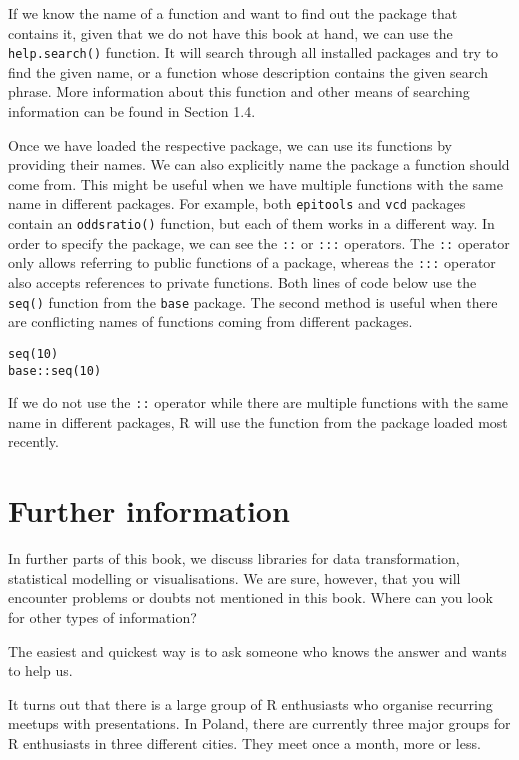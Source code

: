 \documentclass[]{book}
\theoremstyle{definition}
\theoremstyle{definition}
\theoremstyle{definition}
\theoremstyle{remark}
\begin{document}
If we know the name of a function and want to find out the package that
contains it, given that we do not have this book at hand, we can use the
\texttt{help.search()} function. It will search through all installed
packages and try to find the given name, or a function whose description
contains the given search phrase. More information about this function
and other means of searching information can be found in Section 1.4.

Once we have loaded the respective package, we can use its functions by
providing their names. We can also explicitly name the package a
function should come from. This might be useful when we have multiple
functions with the same name in different packages. For example, both
\texttt{epitools} and \texttt{vcd} packages contain an
\texttt{oddsratio()} function, but each of them works in a different
way. In order to specify the package, we can see the \texttt{::} or
\texttt{:::} operators. The \texttt{::} operator only allows referring
to public functions of a package, whereas the \texttt{:::} operator also
accepts references to private functions. Both lines of code below use
the \texttt{seq()} function from the \texttt{base} package. The second
method is useful when there are conflicting names of functions coming
from different packages.

\begin{verbatim}
seq(10)
base::seq(10)
\end{verbatim}

If we do not use the \texttt{::} operator while there are multiple
functions with the same name in different packages, R will use the
function from the package loaded most recently.

\section{Further information}\label{part_14}

In further parts of this book, we discuss libraries for data
transformation, statistical modelling or visualisations. We are sure,
however, that you will encounter problems or doubts not mentioned in
this book. Where can you look for other types of information?

The easiest and quickest way is to ask someone who knows the answer and
wants to help us.

It turns out that there is a large group of R enthusiasts who organise
recurring meetups with presentations. In Poland, there are currently
three major groups for R enthusiasts in three different cities. They
meet once a month, more or less.
\end{document}
